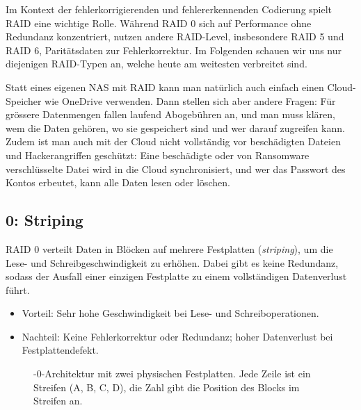 Im Kontext der fehlerkorrigierenden und fehlererkennenden Codierung spielt \gls{RAID} eine wichtige Rolle. Während \gls{RAID} 0 sich auf Performance ohne Redundanz konzentriert, nutzen andere \acrshort{RAID}-Level, insbesondere \gls{RAID} 5 und \gls{RAID} 6, Paritätsdaten zur Fehlerkorrektur. Im Folgenden schauen wir uns nur diejenigen \acrshort{RAID}-Typen an, welche heute am weitesten verbreitet sind.

\begin{myremark}
    Statt eines eigenen \gls{NAS} mit \gls{RAID} kann man natürlich auch einfach einen Cloud-Speicher wie OneDrive verwenden. Dann stellen sich aber andere Fragen: Für grössere Datenmengen fallen laufend Abogebühren an, und man muss klären, wem die Daten gehören, wo sie gespeichert sind und wer darauf zugreifen kann. Zudem ist man auch mit der Cloud nicht vollständig vor beschädigten Dateien und Hackerangriffen geschützt: Eine beschädigte oder von Ransomware verschlüsselte Datei wird in die Cloud synchronisiert, und wer das Passwort des Kontos erbeutet, kann alle Daten lesen oder löschen.
\end{myremark}



\subsection{ 0: Striping}
\gls{RAID} 0 verteilt Daten in Blöcken auf mehrere Festplatten (\textit{striping}), um die Lese- und Schreibgeschwindigkeit zu erhöhen. Dabei gibt es keine Redundanz, sodass der Ausfall einer einzigen Festplatte zu einem vollständigen Datenverlust führt.

\begin{itemize}
    \item Vorteil: Sehr hohe Geschwindigkeit bei Lese- und Schreiboperationen.
    \item Nachteil: Keine Fehlerkorrektur oder Redundanz; hoher Datenverlust bei Festplattendefekt.
\end{itemize}

\begin{figure}[H]
    \centering

    \caption[-0-Architektur mit zwei physischen Festplatten]{-0-Architektur mit zwei physischen Festplatten. Jede Zeile ist ein Streifen (A, B, C, D), die Zahl gibt die Position des Blocks im Streifen an.}
    \label{fig:raid0}
\end{figure}

